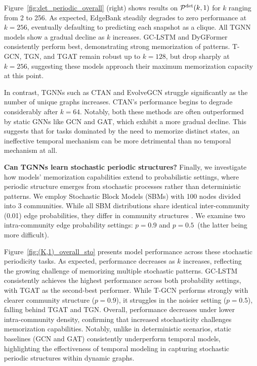  Figure~\ref{fig:det_periodic_overall} (right) shows results on $\mathcal{P}^\text{det}(k, 1)$ for $k$ ranging from 2 to 256. As expected, EdgeBank steadily degrades to zero performance at $k = 256$, eventually defaulting to predicting each snapshot as a clique. All TGNN models show a gradual decline as $k$ increases. GC-LSTM and DyGFormer consistently perform best, demonstrating strong memorization of patterns. T-GCN, TGN, and TGAT remain robust up to $k = 128$, but drop sharply at $k = 256$, suggesting these models approach their maximum memorization capacity at this point.

 In contrast, TGNNs such as CTAN and EvolveGCN struggle significantly as the number of unique graphs increases. CTAN's performance begins to degrade considerably after $k=64$. Notably, both these methods are often outperformed by static GNNs like GCN and GAT, which exhibit a more gradual decline. This suggests that for tasks dominated by the need to memorize distinct states, an ineffective temporal mechanism can be more detrimental than no temporal mechanism at all.

 \textbf{Can TGNNs learn stochastic periodic structures?} Finally, we investigate how models' memorization capabilities extend to probabilistic settings, where periodic structure emerges from stochastic processes rather than deterministic patterns. 
We employ Stochastic Block Models (SBMs) with 100 nodes divided into 3 communities. While all SBM distributions share identical inter-community (0.01) edge probabilities, they differ in community structures 
. We examine two intra-community edge probability settings: $p=0.9$ and $p=0.5$~(the latter being  more difficult). 

Figure~\ref{fig:(K,1)_overall_sto} presents model performance across these stochastic periodicity tasks. As expected, performance decreases as $k$ increases, reflecting the growing challenge of memorizing multiple stochastic patterns. GC-LSTM consistently achieves the highest performance across both probability settings, with TGAT as the second-best performer. While T-GCN performs strongly with clearer community structure ($p=0.9$), it struggles in the noisier setting ($p=0.5$), falling behind TGAT and TGN. Overall, performance decreases under lower intra-community density, confirming that increased stochasticity challenges memorization capabilities. Notably, unlike in deterministic scenarios, static baselines (GCN and GAT) consistently underperform temporal models, highlighting the effectiveness of temporal modeling in capturing stochastic periodic structures within dynamic graphs.

